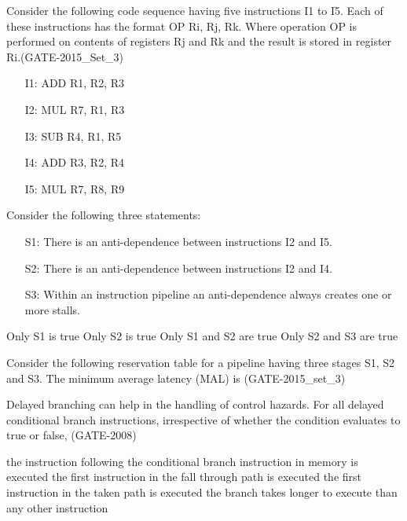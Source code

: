 \begin{questyle}
  \question  Consider the following code sequence having five instructions I1 to I5. Each of these
             instructions has the format OP Ri, Rj, Rk.  Where operation OP is performed on contents
             of registers Rj and Rk and the result is stored in register Ri.(GATE-2015\_Set\_3)
              \begin{enumerate}
                \item[I1:] ADD R1, R2, R3
                \item[I2:] MUL R7, R1, R3
                \item[I3:] SUB R4, R1, R5
                \item[I4:] ADD R3, R2, R4
                \item[I5:] MUL R7, R8, R9
              \end{enumerate}
              Consider the following three statements:
              \begin{enumerate}
                  \item[S1:] There is an anti-dependence between instructions I2 and I5.
                  \item[S2:] There is an anti-dependence between instructions I2 and I4.
                  \item[S3:] Within an instruction pipeline an anti-dependence always creates one or more stalls.
              \end{enumerate}
  \begin{choices}
    \choice         Only S1 is true
    \CorrectChoice  Only S2 is true
    \choice         Only S1 and S2 are true
    \choice         Only S2 and S3 are true
  \end{choices}
\end{questyle}


\begin{questyle}
  \question  Consider the following reservation table for a pipeline having three
             stages S1, S2 and S3. The minimum average latency (MAL) is \fillin[1]  (GATE-2015\_set\_3)
\end{questyle}

\begin{questyle}
  \question  Delayed branching can help in the handling of control hazards. For all delayed
             conditional branch instructions, irrespective of whether the condition evaluates
             to true or false,  (GATE-2008)

  \begin{choices}
    \CorrectChoice  the instruction following the conditional branch instruction in memory is executed
    \choice         the first instruction in the fall through path is executed
    \choice         the first instruction in the taken path is executed
    \choice         the branch takes longer to execute than any other instruction
  \end{choices}
\end{questyle}

